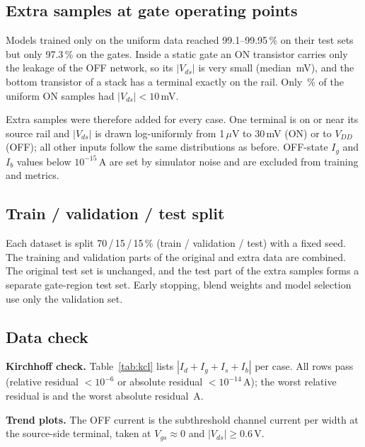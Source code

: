 \documentclass[12pt]{article}
\newcommand{\gentable}[1]{\resizebox{\linewidth}{!}{}}
\begin{document}
\subsection{Extra samples at gate operating points}
\label{sec:extra_samples}
Models trained only on the uniform data reached 99.1--99.95\,\% on their test sets but only
97.3\,\% on the gates. Inside a static gate an ON transistor carries only the leakage of the OFF
network, so its $|V_{ds}|$ is very small (median \OnVdsMedian\,mV), and the bottom transistor of a
stack has a terminal exactly on the rail. Only \OnTrainSmallVds\,\% of the uniform ON samples had
$|V_{ds}|<10$\,mV.

Extra samples were therefore added for every case. One terminal is on or near its source rail and
$|V_{ds}|$ is drawn log-uniformly from 1\,$\mu$V to 30\,mV (ON) or to $V_{DD}$ (OFF); all other
inputs follow the same distributions as before. OFF-state $I_g$ and $I_b$ values below
$10^{-15}$\,A are set by simulator noise and are excluded from training and metrics.

\subsection{Train / validation / test split}
Each dataset is split 70\,/\,15\,/\,15\,\% (train / validation / test) with a fixed seed. The
training and validation parts of the original and extra data are combined. The original test set
is unchanged, and the test part of the extra samples forms a separate gate-region test set. Early
stopping, blend weights and model selection use only the validation set.

\subsection{Data check}
\textbf{Kirchhoff check.} Table~\ref{tab:kcl} lists $|I_d+I_g+I_s+I_b|$ per case. All rows pass
(relative residual $<10^{-6}$ or absolute residual $<10^{-14}$\,A); the worst relative residual is
\KclWorstRel{} and the worst absolute residual \KclWorstAbs\,A.

\begin{table}[H]
\centering
\gentable{tab_kcl}
\caption{Kirchhoff check per case (relative = residual / largest terminal current).}
\label{tab:kcl}
\end{table}

\textbf{Trend plots.} The OFF current is the subthreshold channel current per width at the
source-side terminal, taken at $V_{gs}\approx0$ and $|V_{ds}|\ge0.6$\,V.
\end{document}
